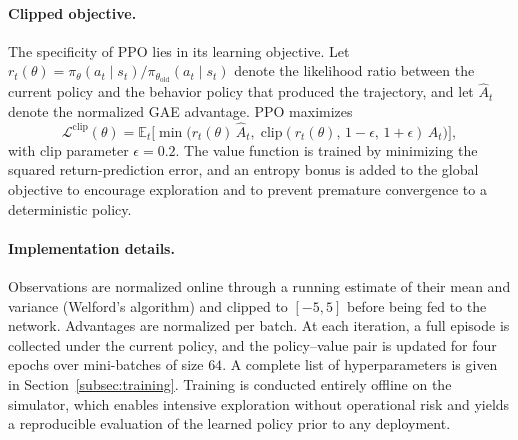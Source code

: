 \paragraph{Clipped objective.}
The specificity of PPO lies in its learning objective. Let
$r_t(\theta) = \pi_\theta(a_t \mid s_t) / \pi_{\theta_{\text{old}}}(a_t \mid s_t)$
denote the likelihood ratio between the current policy and the behavior
policy that produced the trajectory, and let $\hat{A}_t$ denote the
normalized GAE advantage. PPO maximizes
\[
    \mathcal{L}^{\text{clip}}(\theta)
    = \mathbb{E}_t \Big[
        \min \big(r_t(\theta)\, \hat{A}_t,\;
                 \mathrm{clip}(r_t(\theta),\, 1 - \epsilon,\, 1 + \epsilon)\, \hat{A}_t
            \big)
      \Big],
\]
with clip parameter $\epsilon = 0.2$. The value function is trained by
minimizing the squared return-prediction error, and an entropy bonus is
added to the global objective to encourage exploration and to prevent
premature convergence to a deterministic policy.


\paragraph{Implementation details.}
Observations are normalized online through a running estimate of their
mean and variance (Welford's algorithm) and clipped to $[-5, 5]$ before
being fed to the network. Advantages are normalized per batch. At each
iteration, a full episode is collected under the current policy, and the
policy--value pair is updated for four epochs over mini-batches of size
$64$. A complete list of hyperparameters is given in
Section~\ref{subsec:training}. Training is conducted entirely offline on
the simulator, which enables intensive exploration without operational
risk and yields a reproducible evaluation of the learned policy prior to
any deployment.
